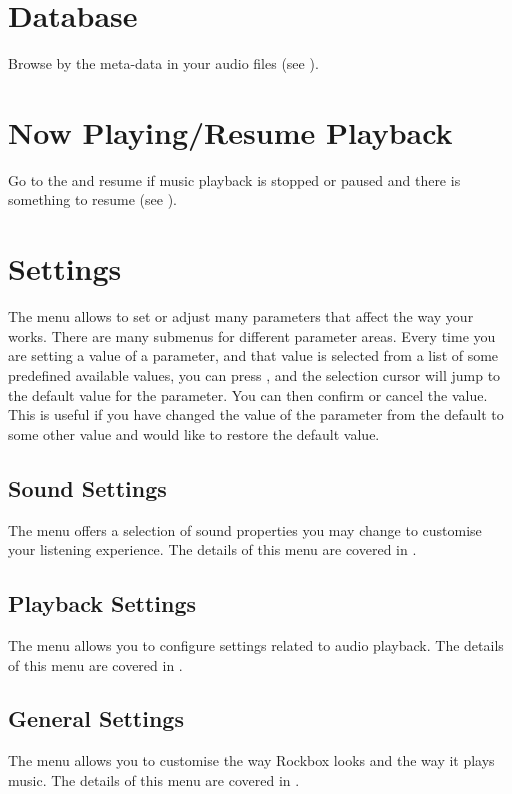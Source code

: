 \section{Database}
Browse by the meta-data in your audio files (see ).

\section{Now Playing/Resume Playback}
Go to the  and resume if music playback is
stopped or paused and there is something to resume (see ).

\section{Settings}

The  menu allows to set or adjust many parameters that affect
the way your \dap{} works. There are many submenus for different parameter
areas. Every time you are setting a value of a parameter, and that value is
selected from a list of some predefined available values, you can press
\ActionStdContext, and the selection cursor will jump to the default value for
the parameter. You can then confirm or cancel the value. This is useful if you
have changed the value of the parameter from the default to some other value and
would like to restore the default value.

\subsection{Sound Settings}
The  menu offers a selection of sound properties you may 
change to customise your listening experience. The details of this menu are covered
in .

\subsection{Playback Settings}
The  menu allows you to configure settings related
to audio playback. The details of this menu are covered
in .

\subsection{General Settings}
The  menu allows you to customise the way Rockbox looks 
and the way it plays music. The details of this menu are covered in
.

